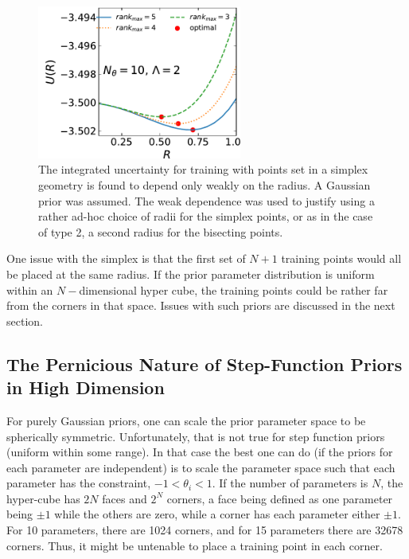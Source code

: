 \documentclass[UserManual.tex]{subfiles}
\begin{document}
\begin{figure}
\centerline{\includegraphics[width=0.6\textwidth]{SimplexUncertainty}}
\caption{\label{fig:SimplexUncertainty}
The integrated uncertainty for training with points set in a simplex geometry is found to depend only weakly on the radius. A Gaussian prior was assumed. The weak dependence was used to justify using a rather ad-hoc choice of radii for the simplex points, or as in the case of type 2, a second radius for the bisecting points.}
\end{figure}

One issue with the simplex is that the first set of $N+1$ training points would all be placed at the same radius. If the prior parameter distribution is uniform within an $N-$dimensional hyper cube, the training  points could be rather far from the corners in that space. Issues with such priors are discussed in the next section.

\subsection{The Pernicious Nature of Step-Function Priors in High Dimension}

For purely Gaussian priors, one can scale the prior parameter space to be spherically symmetric. Unfortunately, that is not true for step function priors (uniform within some range). In that case the best one can do (if the priors for each parameter are independent) is to scale the parameter space such that each parameter has the constraint, $-1<\theta_i<1$. If the number of parameters is $N$, the hyper-cube has $2N$ faces and $2^N$ corners, a face being defined as one parameter being $\pm 1$ while the others are zero, while a corner has each parameter either $\pm 1$. For 10 parameters, there are 1024 corners, and for 15 parameters there are 32678 corners. Thus, it might be untenable to place a training point in each corner. 
\end{document}
